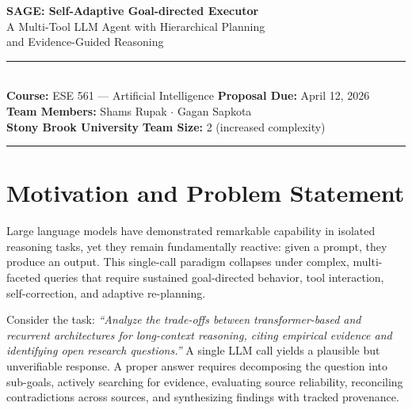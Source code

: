 \documentclass[11pt]{article}
\begin{document}

\begin{center}
  {\LARGE\bfseries\color{primary} SAGE: Self-Adaptive Goal-directed Executor}\\[4pt]
  {\large A Multi-Tool LLM Agent with Hierarchical Planning\\
  and Evidence-Guided Reasoning}\\[10pt]
  \rule{\linewidth}{1pt}\\[6pt]
  {\normalsize
  \textbf{Course:} ESE 561 --- Artificial Intelligence \hspace{1.5cm}
  \textbf{Proposal Due:} April 12, 2026 \\[4pt]
  \textbf{Team Members:} Shams Rupak \quad $\cdot$ \quad Gagan Sapkota \\[4pt]
  \textbf{Stony Brook University} \hspace{1.8cm} \textbf{Team Size:} 2 (increased complexity)
  }\\[4pt]
  \rule{\linewidth}{0.4pt}
\end{center}

\vspace{0.4em}

\section{Motivation and Problem Statement}

Large language models have demonstrated remarkable capability in isolated reasoning tasks,
yet they remain fundamentally reactive: given a prompt, they produce an output. This
single-call paradigm collapses under complex, multi-faceted queries that require sustained
goal-directed behavior, tool interaction, self-correction, and adaptive re-planning.

Consider the task: \textit{``Analyze the trade-offs between transformer-based and recurrent
architectures for long-context reasoning, citing empirical evidence and identifying open
research questions.''} A single LLM call yields a plausible but unverifiable response.
A proper answer requires decomposing the question into sub-goals, actively searching for
evidence, evaluating source reliability, reconciling contradictions across sources, and
synthesizing findings with tracked provenance.
\end{document}

